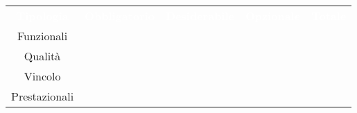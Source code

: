 \renewcommand{\arraystretch}{1.5}


\begin{longtable}{c c c c c} 
	
	\rowcolor{darkblue}
	\textcolor{white}{\textbf{Tipologia}}&
	\textcolor{white}{\textbf{Obbligatorio}}&
	\textcolor{white}{\textbf{Desiderabile}}&
	\textcolor{white}{\textbf{Opzionale}}&
	\textcolor{white}{\textbf{Totale}}\\
	
	Funzionali & \actualrfunO & \actualrfunD & \actualrfunZ & \actualrfun \\
	Qualità & \actualrquaO & \actualrquaD & \actualrquaZ & \actualrqua \\
	Vincolo & \actualrvinO & \actualrvinD & \actualrvinZ & \actualrvin \\
	Prestazionali & \actualrpreO & \actualrpreD & \actualrpreZ & \actualrpre \\

\end{longtable}
